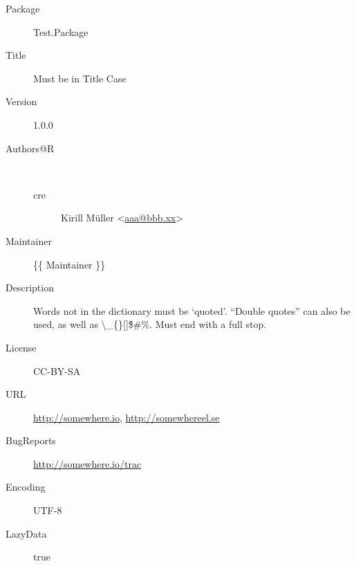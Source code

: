 \begin{description}
  \raggedright{}
  \item[Package] Test.Package
  \item[Title] Must be in Title Case
  \item[Version] 1.0.0
  \item[Authors@R] ~\\
    \begin{description}
      \item[cre] Kirill Müller <\href{mailto:aaa@bbb.xx}{aaa@bbb.xx}>
    \end{description}
  \item[Maintainer] \{\{ Maintainer \}\}
  \item[Description] Words not in the dictionary must be `quoted'. ``Double quotes'' can also be used, as well as \textbackslash \_\{\}[]\^\$\#\%. Must end with a full stop.
  \item[License] CC-BY-SA
  \item[URL] \url{http://somewhere.io}, \url{http://somewhereel.se}
  \item[BugReports] \url{http://somewhere.io/trac}
  \item[Encoding] UTF-8
  \item[LazyData] true
\end{description}
